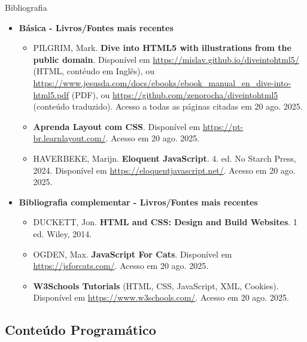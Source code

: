 \documentclass{beamer}
\begin{document}
\begin{frame}{Bibliografia}
    \begin{itemize}
        \item \textbf{Básica - Livros/Fontes mais recentes}
        \begin{itemize}
            \justifying
            \scriptsize
            \item PILGRIM, Mark. \textbf{Dive into HTML5 with illustrations from the public domain}. Disponível em \url{https://mislav.github.io/diveintohtml5/} (HTML, contéudo em Inglês), ou \url{https://www.jesusda.com/docs/ebooks/ebook_manual_en_dive-into-html5.pdf} (PDF), ou \url{https://github.com/zenorocha/diveintohtml5} (conteúdo traduzido). Acesso a todas as páginas citadas em 20 ago. 2025.
            \item \textbf{Aprenda Layout com CSS}. Disponível em \url{https://pt-br.learnlayout.com/}. Acesso em 20 ago. 2025.
            \item HAVERBEKE, Marijn. \textbf{Eloquent JavaScript}. 4. ed. No Starch Press, 2024. Disponível em \url{https://eloquentjavascript.net/}. Acesso em 20 ago. 2025.
        \end{itemize}
        \normalsize
        \item \textbf{Bibliografia complementar - Livros/Fontes mais recentes}
        \begin{itemize}
            \justifying
            \scriptsize
            \item DUCKETT, Jon. \textbf{HTML and CSS: Design and Build Websites}. 1 ed. Wiley, 2014.
            \item OGDEN, Max. \textbf{JavaScript For Cats}. Disponível em \url{https://jsforcats.com/}. Acesso em 20 ago. 2025.
            \item \textbf{W3Schools Tutorials} (HTML, CSS, JavaScript, XML, Cookies). Disponível em \url{https://www.w3schools.com/}. Acesso em 20 ago. 2025.
        \end{itemize}
    \end{itemize}
\end{frame}

\subsection{Conteúdo Programático}
\end{document}
